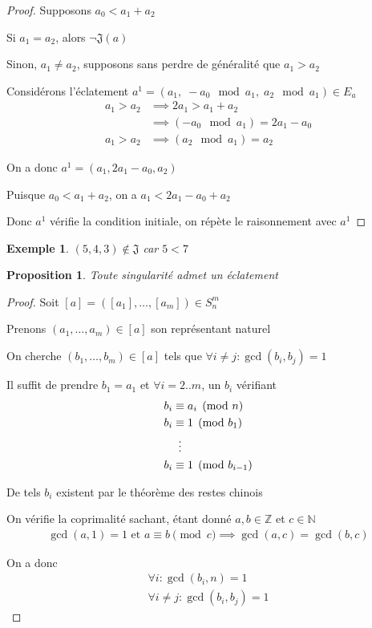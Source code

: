 \documentclass{article}
\newtheorem{proposition}{Proposition}
\newtheorem{exemple}{Exemple}
\begin{document}
\begin{proof}
    Supposons $a_0 < a_1 + a_2$

    Si $a_1 = a_2$, alors $\neg \mathfrak{J}(a)$

    Sinon, $a_1 \neq a_2$, supposons sans perdre de généralité que $a_1 > a_2$

    Considérons l'éclatement $a^1 = (a_1,\; -a_0 \mod a_1,\; a_2 \mod a_1) \in E_a$
    \begin{align*}
        a_1 > a_2 & \implies 2a_1 > a_1+a_2               \\
                  & \implies (-a_0 \mod a_1) = 2a_1 - a_0 \\
        a_1 > a_2 & \implies (a_2 \mod a_1) = a_2
    \end{align*}

    On a donc $a^1 = (a_1, 2a_1-a_0, a_2)$

    Puisque $a_0 < a_1 + a_2$, on a $a_1 < 2a_1 - a_0 + a_2$

    Donc $a^1$ vérifie la condition initiale, on répète le raisonnement avec $a^1$
\end{proof}

\begin{exemple}
    $(5, 4, 3) \not \in \mathfrak{J}$ car $5 < 7$
\end{exemple}

\begin{proposition}
    Toute singularité admet un éclatement
\end{proposition}

\begin{proof}
    Soit $[a] = ([a_1], \dots, [a_m]) \in S_n^m$

    Prenons $(a_1, \dots, a_m) \in [a]$ son représentant naturel

    On cherche $(b_1, \dots, b_m) \in [a]$ tels que $\forall i \neq j : \gcd(b_i, b_j) = 1$

    Il suffit de prendre $b_1 = a_1$ et $\forall i = 2..m$, un $b_i$ vérifiant
    \begin{align*}
        b_i & \equiv a_i \pmod n \\
        b_i & \equiv 1 \pmod {b_1} \\
            & \vdotswithin{\equiv} \\
        b_i & \equiv 1 \pmod {b_{i-1}} 
    \end{align*}

    De tels $b_i$ existent par le théorème des restes chinois

    On vérifie la coprimalité sachant, étant donné $a, b \in \mathbb{Z}$ et $c \in \mathbb{N}$
    \begin{align*}
        \gcd(a, 1) =1 \text{ et } a \equiv b \pmod c \implies \gcd(a, c) = \gcd(b, c)
    \end{align*}

    On a donc
    \begin{align*}
        \forall i : \gcd(b_i, n) = 1 \\
        \forall i\neq j : \gcd(b_i, b_j) = 1
    \end{align*}
\end{proof}
\end{document}
